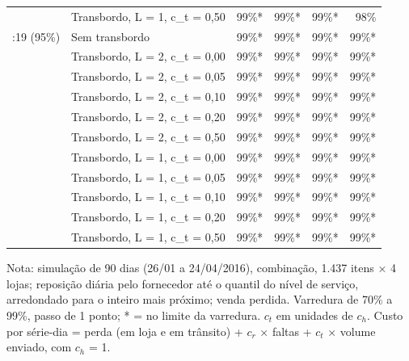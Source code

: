 \begin{table}[htbp]
\begin{tabular}{llrrrr}
 & Transbordo, L = 1, c\_t = 0,50 & 99\%* & 99\%* & 99\%* & 98\% \\
\addlinespace
1:19 (95\%) & Sem transbordo & 99\%* & 99\%* & 99\%* & 99\%* \\
 & Transbordo, L = 2, c\_t = 0,00 & 99\%* & 99\%* & 99\%* & 99\%* \\
 & Transbordo, L = 2, c\_t = 0,05 & 99\%* & 99\%* & 99\%* & 99\%* \\
 & Transbordo, L = 2, c\_t = 0,10 & 99\%* & 99\%* & 99\%* & 99\%* \\
 & Transbordo, L = 2, c\_t = 0,20 & 99\%* & 99\%* & 99\%* & 99\%* \\
 & Transbordo, L = 2, c\_t = 0,50 & 99\%* & 99\%* & 99\%* & 99\%* \\
 & Transbordo, L = 1, c\_t = 0,00 & 99\%* & 99\%* & 99\%* & 99\%* \\
 & Transbordo, L = 1, c\_t = 0,05 & 99\%* & 99\%* & 99\%* & 99\%* \\
 & Transbordo, L = 1, c\_t = 0,10 & 99\%* & 99\%* & 99\%* & 99\%* \\
 & Transbordo, L = 1, c\_t = 0,20 & 99\%* & 99\%* & 99\%* & 99\%* \\
 & Transbordo, L = 1, c\_t = 0,50 & 99\%* & 99\%* & 99\%* & 99\%* \\
\bottomrule
\end{tabular}
\par\smallskip
{\footnotesize Nota: simulação de 90 dias (26/01 a 24/04/2016), combinação, 1.437 itens × 4 lojas; reposição diária pelo fornecedor até o quantil do nível de serviço, arredondado para o inteiro mais próximo; venda perdida. Varredura de 70\% a 99\%, passo de 1 ponto; * = no limite da varredura. $c_t$ em unidades de $c_h$. Custo por série-dia = perda (em loja e em trânsito) + $c_r$ × faltas + $c_t$ × volume enviado, com $c_h$ = 1.}
\end{table}
